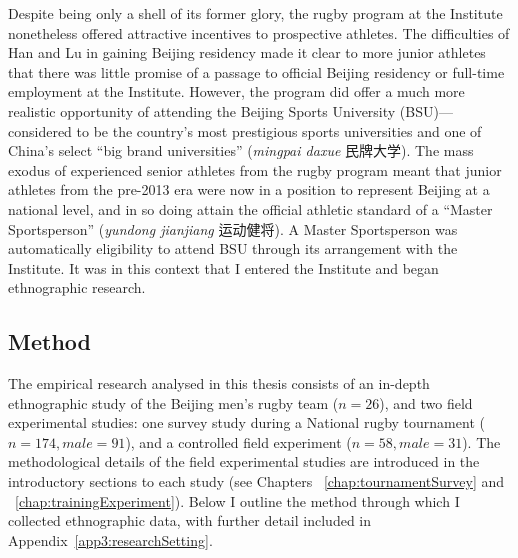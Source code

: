 \begin{CJK}{UTF8}{gbsn}
 Despite being only a shell of its former glory, the rugby program at the Institute nonetheless offered attractive incentives to prospective athletes.  The difficulties of Han and Lu in gaining Beijing residency made it clear to more junior athletes that there was little promise of a passage to official Beijing residency or full-time employment at the Institute.  However, the program did offer a much more realistic opportunity of attending the Beijing Sports University (BSU)---considered to be the country's most prestigious sports universities and one of China's select ``big brand universities'' (\textit{mingpai daxue} 民牌大学).  The mass exodus of experienced senior athletes from the rugby program meant that junior athletes from the pre-2013 era were now in a position to represent Beijing at a national level, and in so doing attain the official athletic standard of a ``Master Sportsperson'' (\textit{yundong jianjiang} 运动健将).  A Master Sportsperson was automatically eligibility to attend BSU through its arrangement with the Institute.  It was in this context that I entered the Institute and began ethnographic research.






 \subsection{Method}
 The empirical research analysed in this thesis consists of an  in-depth ethnographic study of the Beijing men's rugby team ($n = 26$), and two field experimental studies: one survey study during a National rugby tournament ($n = 174, male = 91$), and a controlled field experiment ($n = 58, male = 31$).  The methodological details of the field experimental studies are introduced in the introductory sections to each study (see Chapters ~\ref{chap:tournamentSurvey} and ~\ref{chap:trainingExperiment}).  Below I outline the method through which I collected ethnographic data, with further detail included in Appendix~\ref{app3:researchSetting}.


\end{CJK}
